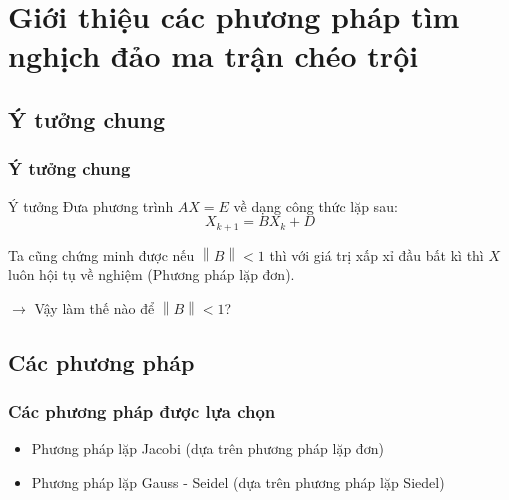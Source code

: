 \section{Giới thiệu các phương pháp tìm nghịch đảo ma trận chéo trội}
    \subsection{Ý tưởng chung}
    \begin{frame}
        \frametitle{Ý tưởng chung}

        \begin{block}{Ý tưởng}
            Đưa phương trình $AX = E$ về dạng công thức lặp sau:
            $$ X_{k+1} = BX_{k} + D $$ 
        \end{block}

        Ta cũng chứng minh được nếu $ \left\lVert B \right\rVert < 1 $ thì với giá trị xấp xỉ đầu bất kì thì $X$ luôn hội tụ về nghiệm (Phương pháp lặp đơn).

        $\longrightarrow$ Vậy làm thế nào để $ \left\lVert B \right\rVert < 1 $?
    \end{frame}

    \subsection{Các phương pháp} 
    \begin{frame}
        \frametitle{Các phương pháp được lựa chọn}
        
        \begin{itemize}
            \item Phương pháp lặp Jacobi (dựa trên phương pháp lặp đơn)
            \item Phương pháp lặp Gauss - Seidel (dựa trên phương pháp lặp Siedel)
        \end{itemize} 
    \end{frame}
